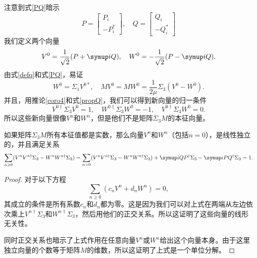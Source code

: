 注意到式\eqref{PQ}暗示
\begin{equation}
  P=\begin{bmatrix}
      P_i\\
      -P^*_i
  \end{bmatrix},\quad Q=\begin{bmatrix}
      Q_i\\
      -Q_i^*
  \end{bmatrix}
\end{equation}
我们定义两个向量
\begin{equation}
  V^0=\frac{1}{\sqrt{2}}(P+\iu Q),\quad W^0=-\frac{1}{\sqrt{2}}(P-\iu Q).
\end{equation}
由式\eqref{defq}和式\eqref{PQ}，易证
\begin{equation}
  W^0 = \Sigma_1 V^{0*},\quad MV^0 = MW^0 = \frac{1}{2\mu}\Sigma_3 (V^0 - W^0).
\end{equation}
并且，用推论\ref{coro4}和式\eqref{propQ}，我们可以得到新向量的归一条件
\begin{equation}
  V^{0\dagger} \Sigma_3 V^0 = 1,\quad W^{0\dagger}\Sigma_3 W^0 =-1 ,\quad V^{0\dagger} \Sigma_3 W^0 =0.
\end{equation}
所以这些新向量很像$V^n$和$W^n$，但是他们不是矩阵$\Sigma_3 M$的本征向量。

\begin{proposition}
    如果矩阵$\Sigma_3 M$所有本征值都是实数，那么向量$V^n$和$W^n$（包括$n=0$），是线性独立的，并且满足关系
    \begin{equation}
  \sum_{n\geq 0} (V^n V^{n\dagger} \Sigma_3 -W^n W^{n\dagger} \Sigma_3) = \sum_{n>0} (V^n V^{n\dagger} \Sigma_3 -W^n W^{n\dagger} \Sigma_3) + \iu QP^\dagger \Sigma_3 -\iu PQ^\dagger \Sigma_3 =1.\label{roi}
\end{equation}

\end{proposition}
\begin{proof}
    对于以下方程
    \begin{equation}
  \sum_{n\geq 0} (c_n V^n +d_n W^n )=0,
\end{equation}
其成立的条件是所有系数$c_n$和$d_n$都为零。这是因为我们可以对上式在两端从左边依次乘上$V^{n\dagger}\Sigma_3$和$W^{n\dagger}\Sigma_3$，然后用他们的正交关系。所以这证明了这些向量的线形无关性。

同时正交关系也暗示了上式作用在任意向量$V^n$或$W^n$给出这个向量本身。由于这里独立向量的个数等于矩阵$M$的维数，所以这证明了上式是一个单位分解。
\end{proof}

